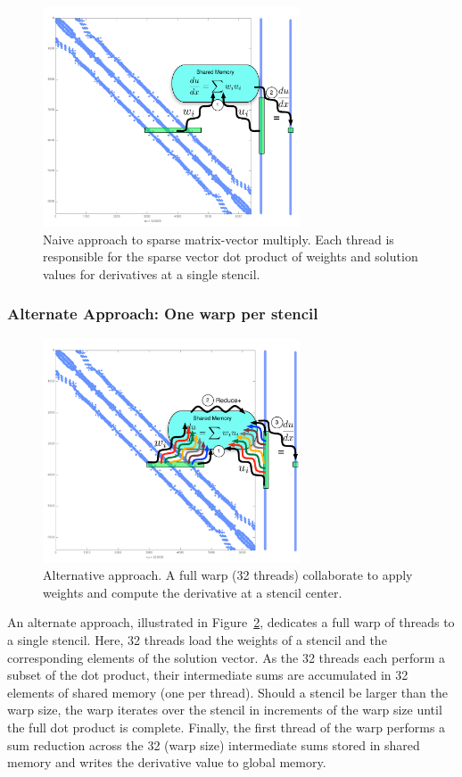 \documentclass{report}
\begin{document}
\begin{figure}[htbp]
      \centering
       \includegraphics[width=3in]{../figures/paper1/figures/omnigraffle/oneThreadPerStencil.pdf}
      \caption{Naive approach to sparse matrix-vector multiply. Each thread is responsible for the sparse vector dot product of weights and solution values for derivatives at a single stencil.  }
      \label{fig:oneThreadPerStencil}
\end{figure}


\subsubsection{Alternate Approach: One warp per stencil} 

\begin{figure}[htbp]
      \centering
       \includegraphics[width=3in]{../figures/paper1/figures/omnigraffle/oneWarpPerStencil.pdf}
      \caption{Alternative approach. A full warp (32 threads) collaborate to apply weights  and compute the derivative at a stencil center. }
      \label{fig:oneWarpPerStencil}
\end{figure}


An alternate approach, illustrated in Figure~\ref{fig:oneWarpPerStencil}, dedicates a full warp of threads to a single stencil. Here, 32 threads load the weights of a stencil and the corresponding elements of the solution vector. As the 32 threads each perform a subset of the dot product, their intermediate sums are accumulated in 32 elements of shared memory (one per thread).
Should  a stencil be larger than the warp size, the warp iterates over the stencil in increments of the warp size until the full dot product is complete. Finally, the first thread of the warp performs a sum reduction across the 32 (warp size)  intermediate sums stored in shared memory and writes the derivative value to global memory. 
\end{document}
